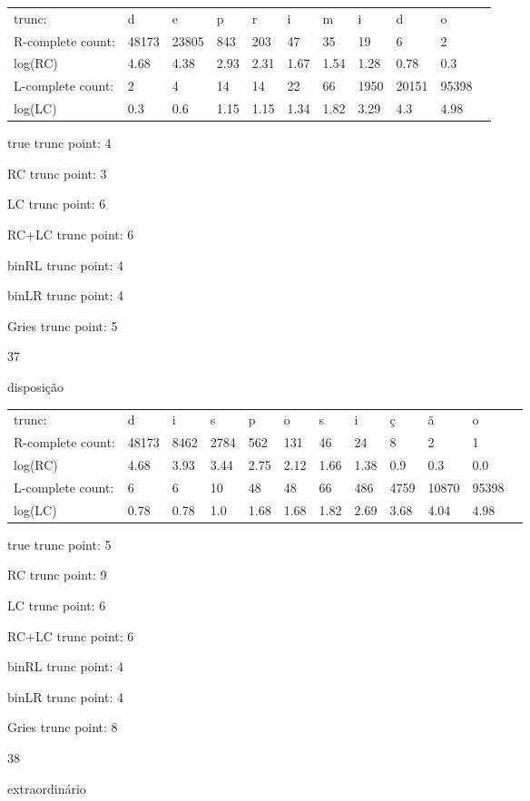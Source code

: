 \documentclass[10pt]{article}
\begin{document}
\begin{tabular}{l|llllllllll}
trunc: & d & e & p & r & i & m & i & d & o & \\ 
R-complete count: & 48173 & 23805 & 843 & 203 & 47 & 35 & 19 & 6 & 2 & \\ 
log(RC) & 4.68 & 4.38 & 2.93 & 2.31 & 1.67 & 1.54 & 1.28 & 0.78 & 0.3 & \\ 
L-complete count: & 2 & 4 & 14 & 14 & 22 & 66 & 1950 & 20151 & 95398 & \\ 
log(LC) & 0.3 & 0.6 & 1.15 & 1.15 & 1.34 & 1.82 & 3.29 & 4.3 & 4.98 & \\ 
\end{tabular}

true trunc point: 4

RC trunc point: 3

LC trunc point: 6

RC+LC trunc point: 6

binRL trunc point: 4

binLR trunc point: 4

Gries trunc point: 5

\newpage

37

disposição

\begin{tabular}{l|lllllllllll}
trunc: & d & i & s & p & o & s & i & ç & ã & o & \\ 
R-complete count: & 48173 & 8462 & 2784 & 562 & 131 & 46 & 24 & 8 & 2 & 1 & \\ 
log(RC) & 4.68 & 3.93 & 3.44 & 2.75 & 2.12 & 1.66 & 1.38 & 0.9 & 0.3 & 0.0 & \\ 
L-complete count: & 6 & 6 & 10 & 48 & 48 & 66 & 486 & 4759 & 10870 & 95398 & \\ 
log(LC) & 0.78 & 0.78 & 1.0 & 1.68 & 1.68 & 1.82 & 2.69 & 3.68 & 4.04 & 4.98 & \\ 
\end{tabular}

true trunc point: 5

RC trunc point: 9

LC trunc point: 6

RC+LC trunc point: 6

binRL trunc point: 4

binLR trunc point: 4

Gries trunc point: 8

\vspace{1em}

38

extraordinário
\end{document}
